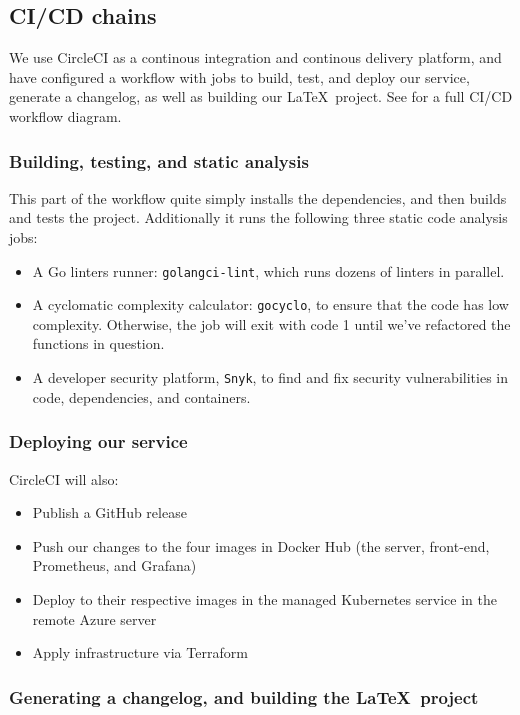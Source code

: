 \subsection{CI/CD chains}

We use CircleCI as a continous integration and continous delivery platform, and have configured a workflow \cite{workflow:circleci} with jobs to build, test, and deploy our service, generate a changelog, as well as building our \LaTeX\ project. See  for a full CI/CD workflow diagram.


\subsubsection{Building, testing, and static analysis}

This part of the workflow quite simply installs the dependencies, and then builds and tests the project. Additionally it runs the following three static code analysis jobs:
\begin{itemize}
    \item A Go linters runner: \texttt{golangci-lint}, which runs dozens of linters in parallel.
    \item A cyclomatic complexity calculator: \texttt{gocyclo}, to ensure that the code has low complexity. Otherwise, the job will exit with code 1 until we've refactored the functions in question.
    \item A developer security platform, \texttt{Snyk}, to find and fix security vulnerabilities in code, dependencies, and containers.
\end{itemize}


\subsubsection{Deploying our service}

CircleCI will also:
\begin{itemize}
    \item Publish a GitHub release
    \item Push our changes to the four images in Docker Hub (the server, front-end, Prometheus, and Grafana)
    \item Deploy to their respective images in the managed Kubernetes service in the remote Azure server
    \item Apply infrastructure via Terraform
\end{itemize}


\subsubsection{Generating a changelog, and building the \LaTeX\ project}


